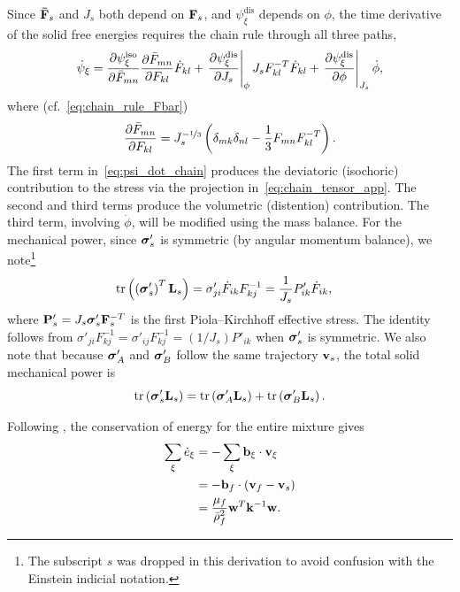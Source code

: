 \documentclass[11pt]{article}
\begin{document}
Since $\mathbf{\bar F}_s$ and $J_s$ both depend on $\mathbf{F}_s$, and $\psi^{\text{dis}}_\xi$ depends on $\phi$, the time derivative of the solid free energies requires the chain rule through all three paths,
%
\begin{align}
  \dot\psi_\xi = \frac{\partial \psi^{\text{iso}}_\xi}{\partial \bar{F}_{mn}} \frac{\partial \bar{F}_{mn}}{\partial F_{kl}} \dot{F}_{kl} + \left.\frac{\partial \psi^{\text{dis}}_\xi}{\partial J_s}\right\vert_\phi J_s F^{-T}_{kl} \dot{F}_{kl} + \left.\frac{\partial \psi^{\text{dis}}_\xi}{\partial \phi}\right\vert_{J_s}\dot\phi,
  \label{eq:psi_dot_chain}
\end{align}
%
where (cf.~\eqref{eq:chain_rule_Fbar})
%
\begin{align}
  \frac{\partial \bar{F}_{mn}}{\partial F_{kl}} = J_s^{-\nicefrac{1}{3}}\left(\delta_{mk}\delta_{nl} - \frac{1}{3} F_{mn} F^{-T}_{kl}\right).
  \label{eq:chain_tensor_app}
\end{align}
%
The first term in~\eqref{eq:psi_dot_chain} produces the deviatoric (isochoric) contribution to the stress via the projection in~\eqref{eq:chain_tensor_app}.  The second and third terms produce the volumetric (distention) contribution.  The third term, involving $\dot\phi$, will be modified using the mass balance.
%
For the mechanical power, since $\boldsymbol{\sigma}'_s$ is symmetric (by angular momentum balance), we note\footnote{The subscript $s$ was dropped in this derivation to avoid confusion with the Einstein indicial notation.}
%
\begin{align}
  \mathrm{tr}\left(\left(\boldsymbol{\sigma}'_s\right)^T \mathbf{L}_s\right) &= \sigma'_{ji} \dot{F}_{ik} F^{-1}_{kj} = \frac{1}{J_s} P'_{ik} \dot{F}_{ik},
  \label{eq:mech_power_app}
\end{align}
%
where $\mathbf{P}'_s = J_s \boldsymbol{\sigma}'_s \mathbf{F}_s^{-T}$ is the first Piola--Kirchhoff effective stress.  The identity follows from $\sigma'_{ji} F^{-1}_{kj} = \sigma'_{ij} F^{-1}_{kj} = (1/J_s) P'_{ik}$ when $\boldsymbol{\sigma}'_s$ is symmetric. We also note that because $\boldsymbol{\sigma}'_A$ and $\boldsymbol{\sigma}'_B$ follow the same trajectory $\mathbf{v}_s$, the total solid mechanical power is
%
\begin{equation*}
\mathrm{tr}\left(\boldsymbol{\sigma}^{\prime}_s \mathbf{L}_s\right) = \mathrm{tr}\left(\boldsymbol{\sigma}^{\prime}_A \mathbf{L}_s\right) + \mathrm{tr}\left(\boldsymbol{\sigma}^{\prime}_B \mathbf{L}_s\right).
\end{equation*}

Following \cite{drumheller1980thermomechanical}, the conservation of energy for the entire mixture gives
%
\begin{align}
  \sum_\xi \dot{e}_\xi &= -\sum_\xi \mathbf{b}_\xi \cdot \mathbf{v}_\xi \notag \\
  &= -\mathbf{b}_f \cdot \left(\mathbf{v}_f -  \mathbf{v}_s\right) \notag \\
  &= \frac{\mu_f}{\bar\rho_f^2} \mathbf{w}^{T} \mathbf{k}^{-1} \mathbf{w}. \label{eq:dissipation}
\end{align}
%
\end{document}
